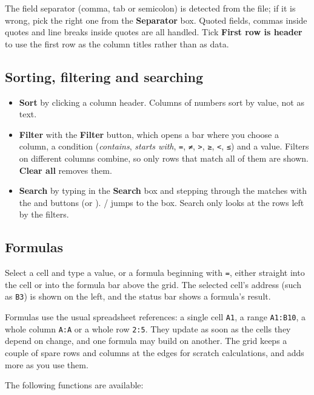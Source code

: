 \documentclass[11pt,a4paper]{article}
\begin{document}
The field separator (comma, tab or semicolon) is detected from the file; if it
is wrong, pick the right one from the \textbf{Separator} box. Quoted fields,
commas inside quotes and line breaks inside quotes are all handled. Tick
\textbf{First row is header} to use the first row as the column titles rather
than as data.

\subsection{Sorting, filtering and searching}

\begin{itemize}
  \item \textbf{Sort} by clicking a column header. Columns of numbers sort by
        value, not as text.
  \item \textbf{Filter} with the \textbf{Filter} button, which opens a bar
        where you choose a column, a condition (\emph{contains}, \emph{starts
        with}, \texttt{=}, \texttt{≠}, \texttt{>}, \texttt{≥}, \texttt{<},
        \texttt{≤}) and a value. Filters on different columns combine, so only
        rows that match all of them are shown. \textbf{Clear all} removes them.
  \item \textbf{Search} by typing in the \textbf{Search} box and stepping
        through the matches with the  and  buttons (or
        ).  /  jumps to the box. Search only
        looks at the rows left by the filters.
\end{itemize}

\subsection{Formulas}

Select a cell and type a value, or a formula beginning with \texttt{=}, either
straight into the cell or into the formula bar above the grid. The selected
cell's address (such as \texttt{B3}) is shown on the left, and the status bar
shows a formula's result.

Formulas use the usual spreadsheet references: a single cell \texttt{A1}, a
range \texttt{A1:B10}, a whole column \texttt{A:A} or a whole row \texttt{2:5}.
They update as soon as the cells they depend on change, and one formula may
build on another. The grid keeps a couple of spare rows and columns at the
edges for scratch calculations, and adds more as you use them.

The following functions are available:
\end{document}

